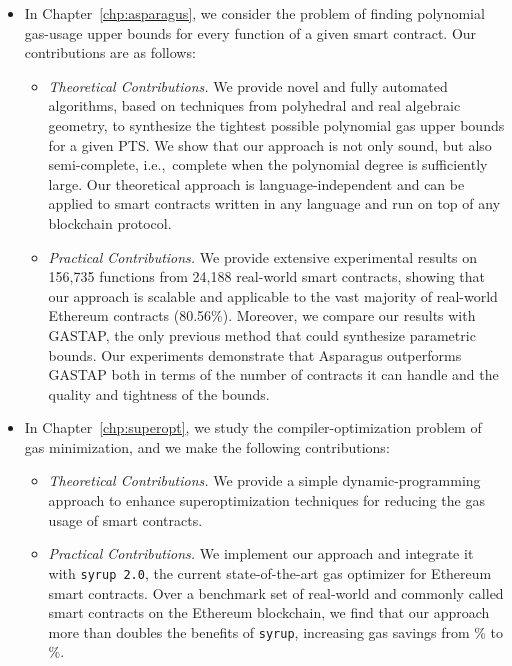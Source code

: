 \begin{itemize}
    \item In Chapter~\ref{chp:asparagus}, we consider the problem of finding polynomial gas-usage upper bounds for every function of a given smart contract. Our contributions are as follows:
    \begin{itemize}
        \item \emph{Theoretical Contributions.} We provide novel and fully automated algorithms, based on techniques from polyhedral and real algebraic geometry, to synthesize the tightest possible polynomial gas upper bounds for a given PTS. We show that our approach is not only sound, but also semi-complete, i.e.,~complete when the polynomial degree is sufficiently large. Our theoretical approach is language-independent and can be applied to smart contracts written in any language and run on top of any blockchain protocol.
        \item \emph{Practical Contributions.} We provide extensive experimental results on 156,735 functions from 24,188 real-world smart contracts, showing that our approach is scalable and applicable to the vast majority of real-world Ethereum contracts (80.56\%). Moreover, we compare our results with GASTAP, the only previous method that could synthesize parametric bounds. Our experiments demonstrate that Asparagus outperforms GASTAP both in terms of the number of contracts it can handle and the quality and tightness of the bounds.
    \end{itemize}

    \item In Chapter~\ref{chp:superopt}, we study the compiler-optimization problem of gas minimization, and we make the following contributions:
    \begin{itemize}
        \item \emph{Theoretical Contributions.} We provide a simple dynamic-programming approach to enhance superoptimization techniques for reducing the gas usage of smart contracts.
        \item \emph{Practical Contributions.} We implement our approach and integrate it with \texttt{syrup 2.0}, the current state-of-the-art gas optimizer for Ethereum smart contracts. Over a benchmark set of  real-world and commonly called smart contracts on the Ethereum blockchain, we find that our approach more than doubles the benefits of \texttt{syrup}, increasing gas savings from \% to \%.
    \end{itemize}


\end{itemize}
